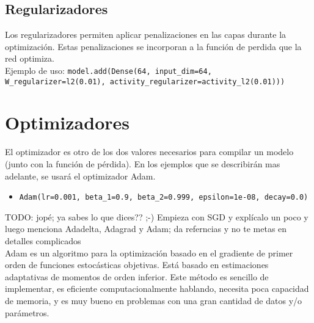 \subsection{Regularizadores}
Los regularizadores permiten aplicar penalizaciones en las capas durante la optimización. Estas penalizaciones se incorporan a la función de perdida que la red optimiza.\\
Ejemplo de uso:
\lstinline{model.add(Dense(64, input_dim=64, W_regularizer=l2(0.01), activity_regularizer=activity_l2(0.01)))}

\section{Optimizadores}
El optimizador es otro de los dos valores necesarios para compilar un modelo (junto con la función de pérdida). En los ejemplos que se describirán mas adelante, se usará el optimizador Adam.
\begin{itemize}
\item \lstinline{Adam(lr=0.001, beta_1=0.9, beta_2=0.999, epsilon=1e-08, decay=0.0)}
\end{itemize}
TODO: jopé; ya sabes lo que dices?? ;-)
Empieza con SGD y explícalo un poco y luego menciona Adadelta, Adagrad y Adam; da referncias y no te metas en detalles complicados\\
Adam es un algoritmo para la optimización basado en el gradiente de primer orden de funciones estocásticas objetivas. Está basado en estimaciones adaptativas de momentos de orden inferior. Este método es sencillo de implementar, es eficiente computacionalmente hablando, necesita poca capacidad de memoria, y es muy bueno en problemas con una gran cantidad de datos y/o parámetros.

